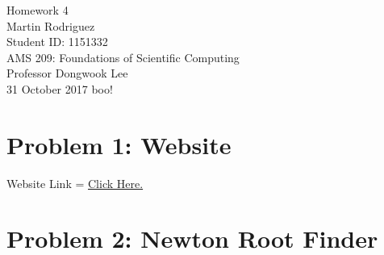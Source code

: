 \documentclass[12pt]{article}
\begin{document}
\begin{center}
	{\LARGE Homework 4} \\[10pt] 
	{ Martin Rodriguez} \\
	Student ID: 1151332\\
	AMS 209: Foundations of Scientific Computing\\
	Professor Dongwook Lee\\[10 pt]	
	31 October 2017 {\tiny boo!} \\[30 pt]
\end{center}




\section*{{\large Problem 1: Website}}

Website Link = \href{https://people.ucsc.edu/~mrodrig6/}{Click Here.}


\section*{{\large Problem 2: Newton Root Finder}}
\end{document}
